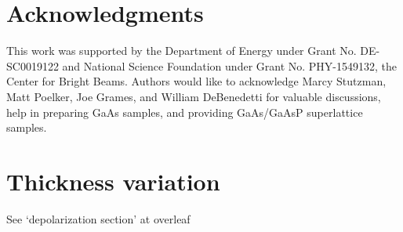 \section{Acknowledgments}
This work was supported by the Department of Energy under Grant No. DE-SC0019122 and National Science Foundation under Grant No. PHY-1549132, the Center for Bright Beams.
Authors would like to acknowledge Marcy Stutzman, Matt Poelker, Joe Grames, and William DeBenedetti for valuable discussions, help in preparing GaAs samples, and providing GaAs/GaAsP superlattice samples.

\section{Thickness variation}
See `depolarization section' at overleaf
